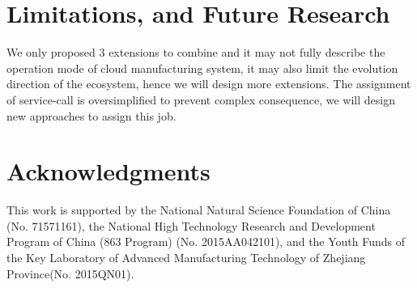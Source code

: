 \section{Limitations, and Future Research} %
\label{sec:contributions_limitations_and_future_research}
We only proposed 3 extensions to combine and it may not fully describe the operation mode of cloud manufacturing system, it may also limit the evolution direction of the ecosystem, hence we will design more extensions. The assignment of service-call is oversimplified to prevent complex consequence, we will design new approaches to assign this job.

\section{Acknowledgments} %
\label{sec:acknowledgments}
This work is supported by the National Natural Science Foundation of China (No. 71571161), the National High Technology Research and Development Program of China (863 Program) (No. 2015AA042101), and the Youth Funds of the Key Laboratory of Advanced Manufacturing Technology of Zhejiang Province(No. 2015QN01). 
